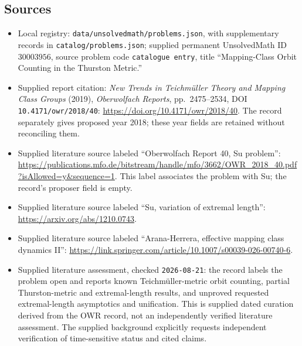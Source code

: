 \documentclass[11pt]{article}
\begin{document}
\subsection{Sources}
\begin{itemize}
\item Local registry: \texttt{data/unsolvedmath/problems.json}, with supplementary records in \texttt{catalog/problems.json}; supplied permanent UnsolvedMath ID \(30003956\), source problem code \texttt{catalogue entry}, title ``Mapping-Class Orbit Counting in the Thurston Metric.''
\item Supplied report citation: \emph{New Trends in Teichm\"uller Theory and Mapping Class Groups} (2019), \emph{Oberwolfach Reports}, pp.\ 2475--2534, DOI \texttt{10.4171/owr/2018/40}: \url{https://doi.org/10.4171/owr/2018/40}. The record separately gives proposed year 2018; these year fields are retained without reconciling them.
\item Supplied literature source labeled ``Oberwolfach Report 40, Su problem'': \url{https://publications.mfo.de/bitstream/handle/mfo/3662/OWR_2018_40.pdf?isAllowed=y&sequence=1}. This label associates the problem with Su; the record's proposer field is empty.
\item Supplied literature source labeled ``Su, variation of extremal length'': \url{https://arxiv.org/abs/1210.0743}.
\item Supplied literature source labeled ``Arana-Herrera, effective mapping class dynamics II'': \url{https://link.springer.com/article/10.1007/s00039-026-00740-6}.
\item Supplied literature assessment, checked \texttt{2026-08-21}: the record labels the problem open and reports known Teichm\"uller-metric orbit counting, partial Thurston-metric and extremal-length results, and unproved requested extremal-length asymptotics and unification. This is supplied dated curation derived from the OWR record, not an independently verified literature assessment. The supplied background explicitly requests independent verification of time-sensitive status and cited claims.
\end{itemize}
\end{document}
